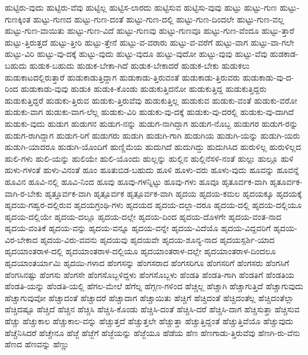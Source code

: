 {ಹುಟ್ಟಿರು-ವುದು
ಹುಟ್ಟಿರು-ವೆವು
ಹುಟ್ಟಿಲ್ಲ
ಹುಟ್ಟಿಸ-ಲಾರದು
ಹುಟ್ಟಿಸುವ
ಹುಟ್ಟಿಸು-ವುವು
ಹುಟ್ಟು
ಹುಟ್ಟು-ಗುಣ
ಹುಟ್ಟು-ಗುಣಕ್ಕಿಂತ
ಹುಟ್ಟು-ಗುಣದ
ಹುಟ್ಟು-ಗುಣ-ದಂತೆ
ಹುಟ್ಟು-ಗುಣ-ದಲ್ಲಿ
ಹುಟ್ಟು-ಗುಣ-ದಿಂದಲೇ
ಹುಟ್ಟು-ಗುಣ-ವಲ್ಲ
ಹುಟ್ಟು-ಗುಣ-ವಾಯಿತು
ಹುಟ್ಟು-ಗುಣ-ವಿದೆ
ಹುಟ್ಟು-ಗುಣವು
ಹುಟ್ಟು-ಗುಣವೂ
ಹುಟ್ಟು-ಗುಣ-ವೆಂದೂ
ಹುಟ್ಟು-ತ್ತಾರೆ
ಹುಟ್ಟು-ತ್ತಿರುತ್ತದೆ
ಹುಟ್ಟು-ತ್ತೀರಿ
ಹುಟ್ಟು-ತ್ತೇನೆ
ಹುಟ್ಟು-ವ-ವರಾರು
ಹುಟ್ಟು-ವ-ವರೆಗೆ
ಹುಟ್ಟು-ವಾಗ
ಹುಟ್ಟು-ವಾ-ಗಲೇ
ಹುಟ್ಟು-ವಿರಿ
ಹುಟ್ಟು-ವು-ದಕ್ಕೆ
ಹುಟ್ಟು-ವುದು
ಹುಟ್ಟು-ವುದೂ
ಹುಟ್ಟು-ವುದೋ
ಹುಟ್ಟು-ವುವು
ಹುಟ್ಟು-ವೆವು
ಹುಡಕಾಡ-ಬಹುದು
ಹುಡುಕ-ಬಹುದು
ಹುಡುಕ-ಬೇಕಾ-ಗಿದೆ
ಹುಡುಕ-ಬೇಕಾದರೆ
ಹುಡುಕ-ಬೇಕು
ಹುಡುಕಲು
ಹುಡುಕಾಟದಲ್ಲಿರುತ್ತಾರೆ
ಹುಡುಕಾಡುತ್ತಿದ್ದಾಗ
ಹುಡುಕಾಡು-ತ್ತಿರುವಂತೆ
ಹುಡುಕಾಡು-ತ್ತಿರುವರು
ಹುಡುಕಾಡು-ವು-ದ-ರಿಂದ
ಹುಡುಕಾಡು-ವುವು
ಹುಡುಕಿ
ಹುಡುಕಿ-ಕೊಂಡು
ಹುಡುಕುತ್ತಿದನೋ
ಹುಡುಕುತ್ತಿದ್ದ
ಹುಡುಕುತ್ತಿದ್ದರು
ಹುಡುಕುತ್ತಿದ್ದರೆ
ಹುಡುಕು-ತ್ತಿರುವ
ಹುಡುಕು-ತ್ತಿರುವೆವು
ಹುಡುಕುತ್ತಿಲ್ಲ
ಹುಡುಕುವ
ಹುಡುಕು-ವಂತೆ
ಹುಡುಕು-ವರೋ
ಹುಡುಕು-ವಾಗ
ಹುಡುಕು-ವಾಗ-ಲೆಲ್ಲ
ಹುಡುಕು-ವಿರಿ
ಹುಡುಕು-ವು-ದಕ್ಕೆ
ಹುಡುಕು-ವು-ದರಲ್ಲಿ
ಹುಡುಕು-ವು-ದಾಗಿದೆ
ಹುಡುಕು-ವುದು
ಹುಡುಗ
ಹುಡುಗನ
ಹುಡುಗ-ನನ್ನು
ಹುಡುಗ-ನಾಗಿದ್ದಾಗ
ಹುಡುಗ-ನೊಬ್ಬ
ಹುಡುಗರ
ಹುಡುಗ-ರನ್ನು
ಹುಡುಗ-ರಾಗಿದ್ದಾಗ
ಹುಡುಗ-ರಿಗೆ
ಹುಡುಗರು
ಹುಡುಗಿ
ಹುಡುಗಿ-ಗಾಗಿ
ಹುಡುಗಿಯ
ಹುಡುಗಿ-ಯನ್ನು
ಹುಡುಗಿ-ಯರು
ಹುಡುಗಿ-ಯಾದರೂ
ಹುಡುಗಿ-ಯೊಂದಿಗೆ
ಹುಣ್ಣಿಮೆಯ
ಹುದುಗಿದೆ
ಹುದುಗಿದ್ದು
ಹುದುಗಿಸಿದ
ಹುರುಳಿಲ್ಲ
ಹುರುಳಿಲ್ಲದ
ಹುಲಿ-ಗಳು
ಹುಲಿ-ಯನ್ನು
ಹುಲಿಯೇ
ಹುಲಿ-ಯೊಂದು
ಹುಲ್ಲನ್ನು
ಹುಲ್ಲಿನ
ಹುಲ್ಲಿನೆಸಳಿ-ನಂತೆ
ಹುಲ್ಲು
ಹುಲ್ಲೂ
ಹುಳಿ
ಹುಳು-ಗಳಂತೆ
ಹುಳು-ವಿನಂತೆ
ಹೂಂ
ಹೂತುಬಿಡ-ಬಹುದು
ಹೂಳಿ
ಹೂಳು-ವರು
ಹೂಳು-ವುದು
ಹೂವನ್ನು
ಹೂವನ್ನೆ
ಹೂವಿನ
ಹೂವಿ-ನಲ್ಲಿ
ಹೂವಿ-ನಿಂದ
ಹೂವು
ಹೂವು-ಗಳನ್ನಿಟ್ಟು
ಹೂವು-ಗಳು
ಹೂವೂ
ಹೃತೂರ್ವಕ-ವಾಗಿ
ಹೃತೂರ್ವಕ-ವಾಗಿ-ರ-ಬೇಕು
ಹೃತ್ತೂರ್ವಕ-ವಾಗಿ
ಹೃತ್ಪೂರ್ವಕ
ಹೃತ್ಪೂರ್ವಕ-ವಾಗಿ
ಹೃದಯ
ಹೃದಯ-ಕಮಲ
ಹೃದಯಕ್ಕೂ
ಹೃದಯಕ್ಕೆ
ಹೃದಯ-ಗಹ್ವರ-ದಲ್ಲಿರುವ
ಹೃದಯಗ್ರಂಥಿ-ಗಳು
ಹೃದಯದ
ಹೃದಯ-ದಲ್ಲಾ-ದರೂ
ಹೃದಯ-ದಲ್ಲಿ
ಹೃದಯ-ದಲ್ಲಿಯೂ
ಹೃದಯ-ದಲ್ಲಿಯೇ
ಹೃದಯ-ದಲ್ಲೂ
ಹೃದಯ-ದಲ್ಲೇ
ಹೃದಯ-ದಿಂದ
ಹೃದಯ-ದೊಳಗೇ
ಹೃದಯ-ವಂತ-ನಾದ
ಹೃದಯ-ವಂತಿಕೆ
ಹೃದಯ-ವನ್ನು
ಹೃದಯ-ವನ್ನೂ
ಹೃದಯ-ವನ್ನೇ
ಹೃದಯ-ವಿದೆಯೊ
ಹೃದಯ-ವಿದ್ದವರಿಗೆ
ಹೃದಯ-ವಿರ-ಬೇಕಾದ
ಹೃದಯ-ವಿರು-ವವನು
ಹೃದಯವು
ಹೃದಯವೇ
ಹೃದಯ-ಶೂನ್ಯ-ನಾದ
ಹೃದಯಸ್ಪರ್ಶಿ-ಯಾದ
ಹೃದಯಾಂತರಾಳ-ದಲ್ಲಿ
ಹೃದಯಾಂತರಾಳ-ದಲ್ಲಿಯೂ
ಹೃದಯಾಂತರಾಳ-ದಲ್ಲೇ
ಹೃದಯಾಂತರಾಳ-ದಿಂದಲೂ
ಹೃದಯಾಂತರ್ಯಾಮಿ
ಹೃದಯಿ-ಗಳಾದ
ಹೆಂಗಸನ್ನು
ಹೆಂಗಸರಾದ
ಹೆಂಗಸರಿಗೂ
ಹೆಂಗಸರಿಗೆ
ಹೆಂಗಸರು
ಹೆಂಗಸಿಗೆ
ಹೆಂಗಸಿನಷ್ಟು
ಹೆಂಗಸು
ಹೆಂಗಸೇ
ಹೆಂಗಸೊಬ್ಬಳಿದ್ದಳು
ಹೆಂಗಸೊಬ್ಬಳು
ಹೆಂಡತಿ
ಹೆಂಡತಿ-ಗಾಗಿ
ಹೆಂಡತಿಗೆ
ಹೆಂಡತಿಯ
ಹೆಂಡತಿ-ಯನ್ನು
ಹೆಂಡತಿ-ಯಲ್ಲಿ
ಹೆಗಲ-ಮೇಲೆ
ಹೆಗೆಲ್ನ
ಹೆಗ್ಗಣ-ಗಳಿಂದ
ಹೆಚ್ಚಲ್ಲ
ಹೆಚ್ಚಾಗಿ
ಹೆಚ್ಚಾಗುತ್ತಿದೆ
ಹೆಚ್ಚಾಗುವುದು
ಹೆಚ್ಚಾಗುವುವೋ
ಹೆಚ್ಚಾದಂತೆ
ಹೆಚ್ಚಾದರೆ
ಹೆಚ್ಚಾದಾಗ
ಹೆಚ್ಚಾಯಿತು
ಹೆಚ್ಚಿಗೆ
ಹೆಚ್ಚಿದಂತೆ
ಹೆಚ್ಚಿದಂತೆಲ್ಲ
ಹೆಚ್ಚಿದಂತೆಲ್ಲಾ
ಹೆಚ್ಚಿದಷ್ಟೂ
ಹೆಚ್ಚಿದೆ
ಹೆಚ್ಚಿನ
ಹೆಚ್ಚಿಸಿ
ಹೆಚ್ಚಿಸಿ-ಕೊಂಡು
ಹೆಚ್ಚಿಸಿ-ದಂತೆ
ಹೆಚ್ಚಿಸಿ-ದರೆ
ಹೆಚ್ಚಿಸಿ-ದಾಗ
ಹೆಚ್ಚಿಸುತ್ತಾ
ಹೆಚ್ಚಿಸುವ
ಹೆಚ್ಚು
ಹೆಚ್ಚುಕಾಲ
ಹೆಚ್ಚುಕಾಲ-ವನ್ನು
ಹೆಚ್ಚುತ್ತದೆ
ಹೆಚ್ಚುತ್ತಲೇ
ಹೆಚ್ಚುತ್ತಾ
ಹೆಚ್ಚುತ್ತಿದ್ದಂತೆ
ಹೆಚ್ಚುತ್ತಿವೆಯೊ
ಹೆಚ್ಚುವುದು
ಹೆಚ್ಚೆನಿಸಿದರೆ
ಹೆಚ್ಚೇನೂ
ಹೆಜ್ಜೆ
ಹೆಜ್ಜೆಗೆ
ಹೆಜ್ಜೆಯನ್ನು
ಹೆಜ್ಜೆಯೂ
ಹೆಡೆಯ
ಹೆಣ
ಹೆಣಗಾಡು-ತ್ತಿರುವೆವು
ಹೆಣಗಿ-ರು-ವೆನು
ಹೆಣದ
ಹೆಣವನ್ನು
ಹೆಣ್ಣು
}
